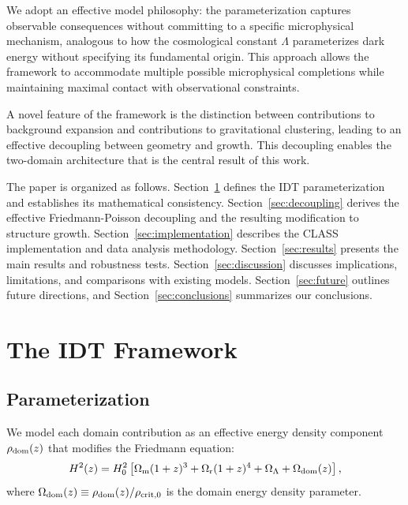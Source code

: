 \documentclass[aps,prd,twocolumn,superscriptaddress,nofootinbib]{revtex4-2}
\newcommand{\Om}{\Omega_{\rm m}}
\newcommand{\Or}{\Omega_{\rm r}}
\newcommand{\OL}{\Omega_\Lambda}
\newcommand{\Odom}{\Omega_{\rm dom}}
\begin{document}
We adopt an effective model philosophy: the parameterization captures 
observable consequences without committing to a specific microphysical 
mechanism, analogous to how the cosmological constant $\Lambda$ 
parameterizes dark energy without specifying its fundamental origin. This 
approach allows the framework to accommodate multiple possible 
microphysical completions while maintaining maximal contact with 
observational constraints.

A novel feature of the framework is the distinction between contributions 
to background expansion and contributions to gravitational clustering, 
leading to an effective decoupling between geometry and growth. This 
decoupling enables the two-domain architecture that is the central result 
of this work.

The paper is organized as follows. Section~\ref{sec:framework} defines the 
IDT parameterization and establishes its mathematical consistency. 
Section~\ref{sec:decoupling} derives the effective Friedmann-Poisson 
decoupling and the resulting modification to structure growth. 
Section~\ref{sec:implementation} describes the CLASS implementation and 
data analysis methodology. Section~\ref{sec:results} presents the main 
results and robustness tests. Section~\ref{sec:discussion} discusses 
implications, limitations, and comparisons with existing models. 
Section~\ref{sec:future} outlines future directions, and 
Section~\ref{sec:conclusions} summarizes our conclusions.


\section{The IDT Framework}
\label{sec:framework}

\subsection{Parameterization}

We model each domain contribution as an effective energy density component 
$\rho_{\rm dom}(z)$ that modifies the Friedmann equation:
\begin{equation}
H^2(z) = H_0^2\left[\Om(1+z)^3 + \Or(1+z)^4 + \OL + \Odom(z)\right],
\label{eq:friedmann}
\end{equation}
where $\Odom(z) \equiv \rho_{\rm dom}(z)/\rho_{\rm crit,0}$ is the domain 
energy density parameter.
\end{document}
